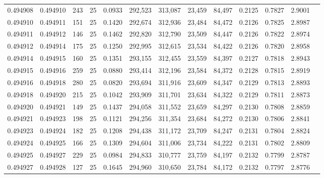 \begin{tabular}{rrrrrrrrrrrrr}
0.494908 & 0.494910 &   243 &  25 &                                     0.0933 & 292,523 & 313,087 &  23,459 &  84,497 & 0.2125 & 0.7827 & 2.9001 \\
0.494910 & 0.494911 &   151 &  25 &                                     0.1420 & 292,674 & 312,936 &  23,484 &  84,472 & 0.2126 & 0.7825 & 2.8987 \\
0.494911 & 0.494912 &   146 &  25 &                                     0.1462 & 292,820 & 312,790 &  23,509 &  84,447 & 0.2126 & 0.7822 & 2.8974 \\
0.494912 & 0.494914 &   175 &  25 &                                     0.1250 & 292,995 & 312,615 &  23,534 &  84,422 & 0.2126 & 0.7820 & 2.8958 \\
0.494914 & 0.494915 &   160 &  25 &                                     0.1351 & 293,155 & 312,455 &  23,559 &  84,397 & 0.2127 & 0.7818 & 2.8943 \\
0.494915 & 0.494916 &   259 &  25 &                                     0.0880 & 293,414 & 312,196 &  23,584 &  84,372 & 0.2128 & 0.7815 & 2.8919 \\
0.494916 & 0.494918 &   280 &  25 &                                     0.0820 & 293,694 & 311,916 &  23,609 &  84,347 & 0.2129 & 0.7813 & 2.8893 \\
0.494918 & 0.494920 &   215 &  25 &                                     0.1042 & 293,909 & 311,701 &  23,634 &  84,322 & 0.2129 & 0.7811 & 2.8873 \\
0.494920 & 0.494921 &   149 &  25 &                                     0.1437 & 294,058 & 311,552 &  23,659 &  84,297 & 0.2130 & 0.7808 & 2.8859 \\
0.494921 & 0.494923 &   198 &  25 &                                     0.1121 & 294,256 & 311,354 &  23,684 &  84,272 & 0.2130 & 0.7806 & 2.8841 \\
0.494923 & 0.494924 &   182 &  25 &                                     0.1208 & 294,438 & 311,172 &  23,709 &  84,247 & 0.2131 & 0.7804 & 2.8824 \\
0.494924 & 0.494925 &   166 &  25 &                                     0.1309 & 294,604 & 311,006 &  23,734 &  84,222 & 0.2131 & 0.7802 & 2.8809 \\
0.494925 & 0.494927 &   229 &  25 &                                     0.0984 & 294,833 & 310,777 &  23,759 &  84,197 & 0.2132 & 0.7799 & 2.8787 \\
0.494927 & 0.494928 &   127 &  25 &                                     0.1645 & 294,960 & 310,650 &  23,784 &  84,172 & 0.2132 & 0.7797 & 2.8776 \\

\end{tabular}
